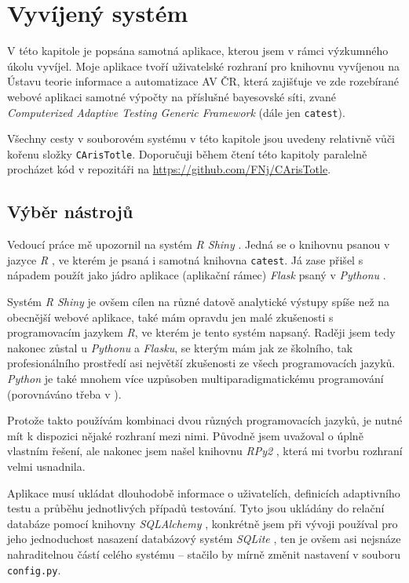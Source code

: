 \documentclass[a4paper,twoside,12pt]{scrbook}
\begin{document}

\chapter{Vyvíjený systém}
V této kapitole je popsána samotná aplikace, kterou jsem v rámci výzkumného úkolu vyvíjel. Moje aplikace tvoří uživatelské rozhraní pro knihovnu vyvíjenou na Ústavu teorie informace a automatizace AV ČR, která zajišťuje ve zde rozebírané webové aplikaci samotné výpočty na příslušné bayesovské síti, zvané \textit{Computerized Adaptive Testing Generic Framework} (dále jen \texttt{catest}).

Všechny cesty v souborovém systému v této kapitole jsou uvedeny relativně vůči kořenu složky \texttt{CArisTotle}. Doporučuji během čtení této kapitoly paralelně procházet kód v repozitáři na \url{https://github.com/FNj/CArisTotle}.

\section{Výběr nástrojů}
Vedoucí práce mě upozornil na systém \textit{R Shiny}  \cite{r_shiny}. Jedná se o knihovnu psanou v jazyce \textit{R} \cite{R}, ve kterém je psaná i samotná knihovna \texttt{catest}. Já zase přišel s nápadem použít jako jádro aplikace  (aplikační rámec) \textit{Flask}  \cite{flask} psaný v \textit{Pythonu}  \cite{python}.

Systém \textit{R Shiny} je ovšem cílen na různé datově analytické výstupy spíše než na obecnější webové aplikace, také mám opravdu jen malé zkušenosti s programovacím jazykem \textit{R}, ve kterém je tento systém napsaný. Raději jsem tedy nakonec zůstal u \textit{Pythonu} a \textit{Flasku}, se kterým mám jak ze školního, tak profesionálního prostředí asi největší zkušenosti ze všech programovacích jazyků. \textit{Python} je také mnohem více uzpůsoben multiparadigmatickému programování (porovnáváno třeba v \cite{multiparadigm}).

Protože takto používám kombinaci dvou různých programovacích jazyků, je nutné mít k dispozici nějaké rozhraní mezi nimi. Původně jsem uvažoval o úplně vlastním řešení, ale nakonec jsem našel knihovnu \textit{RPy2} \cite{rpy2}, která mi tvorbu rozhraní velmi usnadnila.

Aplikace musí ukládat dlouhodobě informace o uživatelích, definicích adaptivního testu a průběhu jednotlivých případů testování. Tyto jsou ukládány do relační databáze pomocí knihovny \textit{SQLAlchemy} \cite{sqlalchemy}, konkrétně jsem při vývoji používal pro jeho jednoduchost nasazení databázový systém \textit{SQLite} \cite{sqlite}, ten je ovšem asi nejsnáze nahraditelnou částí celého systému -- stačilo by mírně změnit nastavení v souboru \texttt{config.py}.
\end{document}
